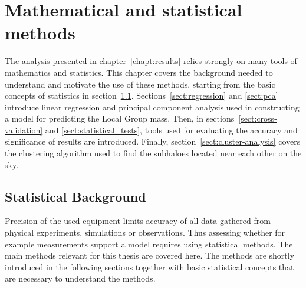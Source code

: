 \documentclass[english, twoside]{HYgradu}
\begin{document}
\chapter{Mathematical and statistical methods} \label{chapt:mathematical_and_statistical}
The analysis presented in chapter~\ref{chapt:results} relies strongly on many tools of mathematics and statistics. This chapter covers the background needed to understand and motivate the use of these methods, starting from the basic concepts of statistics in section~\ref{sect:statistical-background}. Sections~\ref{sect:regression} and \ref{sect:pca} introduce linear regression and principal component analysis used in constructing a model for predicting the Local Group mass. Then, in sections~\ref{sect:cross-validation} and \ref{sect:statistical_tests}, tools used for evaluating the accuracy and significance of results are introduced. Finally, section~\ref{sect:cluster-analysis} covers the clustering algorithm used to find the subhaloes located near each other on the sky.


\section{Statistical Background} \label{sect:statistical-background}

Precision of the used equipment limits accuracy of all data gathered from physical experiments, simulations or observations. Thus assessing whether for example measurements support a model requires using statistical methods. The main methods relevant for this thesis are covered here. The methods are shortly introduced in the following sections together with basic statistical concepts that are necessary to understand the methods. 

\end{document}

